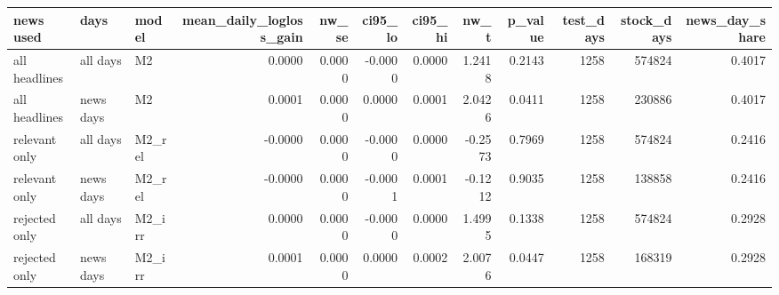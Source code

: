 \begin{tabular}{lllrrrrrrrrr}
\toprule
news used & days & model & mean\_daily\_logloss\_gain & nw\_se & ci95\_lo & ci95\_hi & nw\_t & p\_value & test\_days & stock\_days & news\_day\_share \\
\midrule
all headlines & all days & M2 & 0.0000 & 0.0000 & -0.0000 & 0.0000 & 1.2418 & 0.2143 & 1258 & 574824 & 0.4017 \\
all headlines & news days & M2 & 0.0001 & 0.0000 & 0.0000 & 0.0001 & 2.0426 & 0.0411 & 1258 & 230886 & 0.4017 \\
relevant only & all days & M2\_rel & -0.0000 & 0.0000 & -0.0000 & 0.0000 & -0.2573 & 0.7969 & 1258 & 574824 & 0.2416 \\
relevant only & news days & M2\_rel & -0.0000 & 0.0000 & -0.0001 & 0.0001 & -0.1212 & 0.9035 & 1258 & 138858 & 0.2416 \\
rejected only & all days & M2\_irr & 0.0000 & 0.0000 & -0.0000 & 0.0000 & 1.4995 & 0.1338 & 1258 & 574824 & 0.2928 \\
rejected only & news days & M2\_irr & 0.0001 & 0.0000 & 0.0000 & 0.0002 & 2.0076 & 0.0447 & 1258 & 168319 & 0.2928 \\
\bottomrule
\end{tabular}
